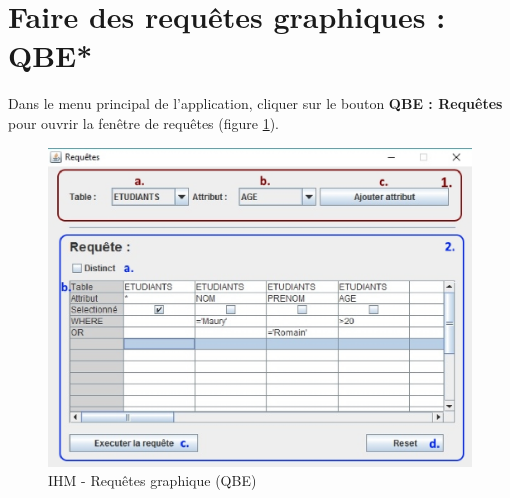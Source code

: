 \section{Faire des requêtes graphiques : QBE*}

Dans le menu principal de l'application, cliquer sur le bouton \textbf{QBE : Requêtes} pour ouvrir la fenêtre de requêtes (figure \ref{qbe_gui}).

\begin{figure}[!h]
\centering
\includegraphics[width=12cm]{./images/manuel/qbe.eps}
\caption{IHM - Requêtes graphique (QBE)}
\label{qbe_gui}
\end{figure}

